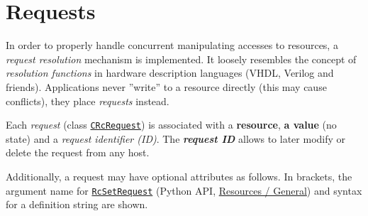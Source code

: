 \documentclass[12pt,english,parskip=half,headheight=19pt]{scrreprt}
\newcommand{\refapic}[1]{\href{home2l-api_c/index.html}{\mbox{\texttt{#1}}}}            %
\newcommand{\refapipython}[1]{\href{home2l-api_python/index.html}{\mbox{\texttt{#1}}}}  %
\newcommand{\refapipythongroup}[2]{\href{home2l-api_python/group__#1.html}{#2}}      %
\begin{document}
\section{Requests}
\label{sec:resources-requests}


In order to properly handle concurrent manipulating accesses to resources, a \textit{request resolution} mechanism is implemented. It loosely resembles the concept of \textit{resolution functions} in hardware description languages (VHDL, Verilog and friends).
Applications never ''write'' to a resource directly (this may cause conflicts), they place \textit{requests} instead.

Each \textit{request} (class \refapic{CRcRequest}) is associated with a
\textbf{resource}, \textbf{a value} (no state) and a \textit{request identifier (ID)}. The
\textbf{\textit{request ID}} allows to later modify or delete the request from any host.

Additionally, a request may have optional attributes as follows. In brackets, the argument name for \refapipython{RcSetRequest}
(Python API, \refapipythongroup{resources__general}{Resources / General}) and syntax for a definition string are shown.
\end{document}
